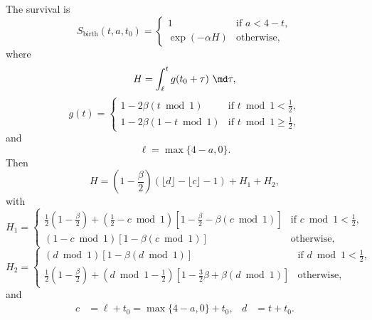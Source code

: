 \documentclass{jpmarticle}
\begin{document}
The survival is
\begin{equation}
  S_{\text{birth}}(t, a, t_0) =
  \begin{cases}
    1 & \text{if $a < 4 - t$},
    \\
    \exp(-\alpha H) & \text{otherwise},
  \end{cases}
\end{equation}
where
\begin{equation}
  H =
  \int_{\ell}^t g(t_0 + \tau)~\md \tau,
\end{equation}
\begin{equation}
  g (t) =
  \begin{cases}
    1 - 2 \beta (t \bmod 1)
    & \text{if $t \bmod 1 < \frac{1}{2}$},
    \\
    1 - 2 \beta (1 - t \bmod 1)
    & \text{if $t \bmod 1 \geq \frac{1}{2}$},
  \end{cases}
\end{equation}
and
\begin{equation}
  \ell = \max\{4 - a, 0\}.
\end{equation}
Then
\begin{equation}
  H =
  \left(1 - \frac{\beta}{2}\right)
  \left(\lfloor d \rfloor - \lfloor c \rfloor - 1\right)
  + H_1  + H_2,
\end{equation}
with
\begin{equation}
  H_1 =
  \begin{cases}
    \frac{1}{2} \left(1 - \frac{\beta}{2}\right)
    + \left(\frac{1}{2} - c \bmod 1\right)
    \left[1 - \frac{\beta}{2} - \beta \left(c \bmod 1\right)\right]
    & \text{if $c \bmod 1 < \frac{1}{2}$},
    \\
    \left(1 - c \bmod 1\right)
    \left[ 1 - \beta \left(c \bmod 1\right)\right]
    & \text{otherwise},
  \end{cases}
\end{equation}
\begin{equation}
  H_2 =
  \begin{cases}
    \left(d \bmod 1\right)\left[1 - \beta \left(d \bmod 1\right)\right]
    & \text{if $d \bmod 1 < \frac{1}{2}$},
    \\
    \frac{1}{2} \left(1 - \frac{\beta}{2}\right)
    + \left(d \bmod 1 - \frac{1}{2}\right)
    \left[1 - \frac{3}{2} \beta + \beta \left(d \bmod 1\right)\right]
    & \text{otherwise},
    \end{cases}
\end{equation}
and
\begin{align}
  c &= \ell + t_0 = \max\{4 - a, 0\} + t_0,
  &
  d &= t + t_0.
\end{align}
\end{document}
